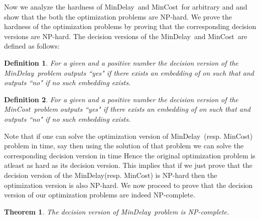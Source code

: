\documentclass[journal]{IEEEtran}
\newtheorem{theorem}{{\bf Theorem}}
\newtheorem{definition}{{\bf Definition}}
\newcommand{\mincost}{\textsf{MinCost}}
\newcommand{\mindelay}{\textsf{MinDelay}}
\begin{document}
Now we analyze the hardness of \mindelay\ and \mincost\ for arbitrary
 and  and show that the both the optimization
problems are NP-hard. We prove the hardness of the optimization
problems by proving that the corresponding decision versions are
NP-hard. The decision versions of the \mindelay\ and \mincost\ are
defined as follows:

\begin{definition}
  For a given  and a positive
  number  the decision version of the \mindelay\ problem outputs
  \textit{``yes"} if there exists an embedding  of
   on  such that  and outputs
  \textit{``no"} if no such embedding exists.
\end{definition}

\begin{definition} 
  For a given  and a positive
  number  the decision version of the \mincost\ problem outputs
  \textit{``yes"} if there exists an embedding  of
   on  such that  and outputs
  \textit{``no"} if no such embedding exists.
\end{definition}

Note that if one can solve the optimization version of \mindelay\
(resp. \mincost) problem in time, say  then using the solution of
that problem we can solve the corresponding decision version in time
 Hence the original optimization problem is atleast as hard as
its decision version. This implies that if we just prove that the
decision version of the \mindelay (resp. \mincost) is NP-hard then the
optimization version is also NP-hard. We now proceed to prove that the
decision version of our optimization problems are indeed NP-complete.

\begin{theorem}
\label{thm:delay}
The decision version of \mindelay\ problem is NP-complete.
\end{theorem}
\end{document}
